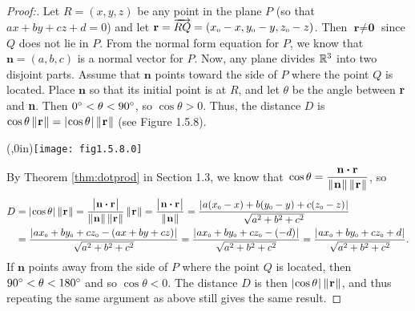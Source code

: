 \begin{proofbar}\begin{proof}[Proof:]
 \par\noindent Let $R = (x,y,z)$ be any point in the plane $P$ (so that $ax + by + cz + d = 0$)
 and let $\textbf{r} = \overrightarrow{RQ} =
 (x_{\scriptscriptstyle 0} - x,y_{\scriptscriptstyle 0} - y,z_{\scriptscriptstyle 0} - z)$. 
 Then $\textbf{r} \ne \textbf{0}$ since $Q$ does not lie in $P$.
 From the normal form equation for $P$, we know that $\textbf{n} = (a,b,c)$ is a normal vector for $P$. 
 Now, any plane
 divides $\mathbb{R}^{3}$ into two disjoint parts. Assume that $\textbf{n}$ points toward the side of $P$ where the point
 $Q$ is located. 
 Place $\textbf{n}$ so that its initial point is at $R$, and let $\theta$ be the angle between
 \textbf{r} and \textbf{n}. Then $0^\circ < \theta < 90^\circ$, so $\cos \theta > 0$. 
 Thus, the distance $D$ is
 $\cos \theta \,\lVert\mspace{1mu}\textbf{r}\mspace{1mu}\rVert = \lvert\mspace{1mu}\cos \theta\mspace{1mu}\rvert\,\lVert\mspace{1mu}\textbf{r}\mspace{1mu}\rVert$ (see Figure 1.5.8).

 \piccaption[]{}\parpic(\textwidth,0in){\texttt{[image: fig1.5.8.0]}
 \piccaptioninside}
 \par\mbox{}\newline\smallskip{}

 By Theorem \ref{thm:dotprod} in Section 1.3, we know that 
 $\,\cos \theta = \dfrac{\textbf{n} \bm{\cdot} \textbf{r}}{\lVert\mspace{1mu}\textbf{n}\mspace{1mu}\rVert\,\lVert\mspace{1mu}\textbf{r}\mspace{1mu}\rVert}$, so
 \begin{align*}
  D &= \lvert\mspace{1mu}\cos \theta\mspace{1mu}\rvert\,\lVert\mspace{1mu}\textbf{r}\mspace{1mu}\rVert
     = \frac{\bigl\lvert\mspace{1mu}\textbf{n} \bm{\cdot} \textbf{r}\mspace{1mu}\bigr\rvert}{\lVert\mspace{1mu}\textbf{n}\mspace{1mu}\rVert \,
     \lVert\mspace{1mu}\textbf{r}\mspace{1mu}\rVert}\,\lVert\mspace{1mu}\textbf{r}\mspace{1mu}\rVert
     = \frac{\bigl\lvert\mspace{1mu}\textbf{n} \bm{\cdot} \textbf{r}\mspace{1mu}\bigr\rvert}{\lVert\mspace{1mu}\textbf{n}\mspace{1mu}\rVert}
     = \frac{\lvert\mspace{1mu}a(x_{\scriptscriptstyle 0} - x) + b(y_{\scriptscriptstyle 0} - y) + c(z_{\scriptscriptstyle 0} - z)\mspace{1mu}\rvert}{\sqrt{a^2 + b^2 + c^2}}\\
    &= \frac{\lvert\mspace{1mu}ax_{\scriptscriptstyle 0} + by_{\scriptscriptstyle 0} + cz_{\scriptscriptstyle 0} - (ax + by + cz)\mspace{1mu}\rvert}{\sqrt{a^2 + b^2 + c^2}}
    = \frac{\lvert\mspace{1mu}ax_{\scriptscriptstyle 0} + by_{\scriptscriptstyle 0} + cz_{\scriptscriptstyle 0} - (-d)\mspace{1mu}\rvert}{\sqrt{a^2 + b^2 + c^2}}
     = \frac{\lvert\mspace{1mu}ax_{\scriptscriptstyle 0} + by_{\scriptscriptstyle 0} + cz_{\scriptscriptstyle 0} + d\mspace{1mu}\rvert}{\sqrt{a^2 + b^2 + c^2}}.
 \end{align*}
 If $\textbf{n}$ points away from the side of $P$ where the point $Q$ is located, then $90^\circ < \theta <
 180^\circ$ and so $\cos \theta < 0$. The distance $D$ is then $\lvert\mspace{1mu}\cos \theta\mspace{1mu}\rvert \, \lVert\mspace{1mu}\textbf{r}\mspace{1mu}\rVert$, and thus
 repeating the same argument as above still gives the same result. \hfill \qedhere
\end{proof}\end{proofbar}


